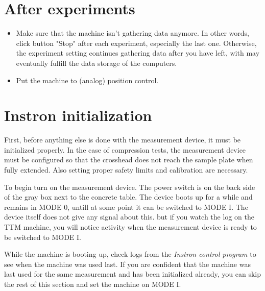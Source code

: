 \documentclass[a4paper]{article}
\begin{document}
\section{After experiments}

\begin{itemize}
  \item Make sure that the machine isn't gathering data anymore. In other words, click button "Stop" after each experiment, especially the last one. Otherwise, the experiment setting continues gathering data after you have left, with may eventually fulfill the data storage of the computers.
  \item Put the machine to (analog) position control.
\end{itemize}

\clearpage

\section{Instron initialization}

First, before anything else is done with the measurement device, it
must be initialized properly. In the case of compression tests, the
measurement device must be configured so that the crosshead does not
reach the sample plate when fully extended. Also setting proper safety
limits and calibration are necessary.


To begin turn on the measurement device. The power switch is on the
back side of the gray box next to the concrete table. The device boots
up for a while and remains in \textsf{MODE 0}, untill at some point it
can be switched to \textsf{MODE I}. The device itself does not give
any signal about this. but if you watch the log on the TTM machine,
you will notice activity when the measurement device is ready to be
switched to \textsf{MODE I}.

While the machine is booting up, check logs from the {\it Instron
control program} to see when the machine was used last. If you are
confident that the machine was last used for the same measurement and
has been initialized already, you can skip the rest of this section
and set the machine on \textsf{MODE I}.
\end{document}
